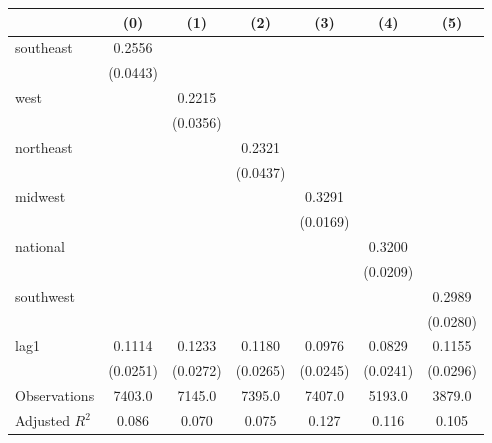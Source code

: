 \begin{tabular}{lcccccc}
\toprule
 & (0) & (1) & (2) & (3) & (4) & (5) \\
\midrule
southeast & 0.2556 &  &  &  &  &  \\
\vspace{0.2cm}
 & (0.0443) &  &  &  &  &  \\
west &  & 0.2215 &  &  &  &  \\
\vspace{0.2cm}
 &  & (0.0356) &  &  &  &  \\
northeast &  &  & 0.2321 &  &  &  \\
\vspace{0.2cm}
 &  &  & (0.0437) &  &  &  \\
midwest &  &  &  & 0.3291 &  &  \\
\vspace{0.2cm}
 &  &  &  & (0.0169) &  &  \\
national &  &  &  &  & 0.3200 &  \\
\vspace{0.2cm}
 &  &  &  &  & (0.0209) &  \\
southwest &  &  &  &  &  & 0.2989 \\
\vspace{0.2cm}
 &  &  &  &  &  & (0.0280) \\
lag1 & 0.1114 & 0.1233 & 0.1180 & 0.0976 & 0.0829 & 0.1155 \\
\vspace{0.2cm}
 & (0.0251) & (0.0272) & (0.0265) & (0.0245) & (0.0241) & (0.0296) \\
\midrule
Observations & 7403.0 & 7145.0 & 7395.0 & 7407.0 & 5193.0 & 3879.0 \\
Adjusted $R^2$ & 0.086 & 0.070 & 0.075 & 0.127 & 0.116 & 0.105 \\
\bottomrule
\end{tabular}